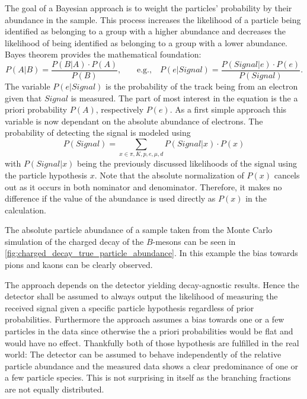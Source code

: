 The goal of a Bayesian approach is to weight the particles' probability by their abundance in the sample. This process increases the likelihood of a particle being identified as belonging to a group with a higher abundance and decreases the likelihood of being identified as belonging to a group with a lower abundance. Bayes theorem provides the mathematical foundation:
\begin{equation*}
	\displaystyle P(A|B) = \frac{P(B|A) \cdot P(A)}{P(B)}
	\text{,}
	\qquad
	\text{e.g.,} \quad P(e|Signal) = \frac{P(Signal|e) \cdot P(e)}{P(Signal)}.
\end{equation*}
The variable $P(e|Signal)$ is the probability of the track being from an electron given that $Signal$ is measured. The part of most interest in the equation is the a priori probability $P(A)$, respectively $P(e)$. As a first simple approach this variable is now dependant on the absolute abundance of electrons. The probability of detecting the signal is modeled using
\begin{equation*}
	P(Signal) = \sum \limits_{x \in {\pi, K, p, e, \mu, d}} P(Signal|x) \cdot P(x)
\end{equation*}
with $P(Signal|x)$ being the previously discussed likelihoods of the signal using the particle hypothesis $x$. Note that the absolute normalization of $P(x)$ cancels out as it occurs in both nominator and denominator. Therefore, it makes no difference if the value of the abundance is used directly as $P(x)$ in the calculation.

The absolute particle abundance of a sample taken from the Monte Carlo simulation of the charged decay of the $B$-mesons can be seen in \autoref{fig:charged_decay_true_particle_abundance}. In this example the bias towards pions and kaons can be clearly observed.

The approach depends on the detector yielding decay-agnostic results. Hence the detector shall be assumed to always output the likelihood of measuring the received signal given a specific particle hypothesis regardless of prior probabilities. Furthermore the approach assumes a bias towards one or a few particles in the data since otherwise the a priori probabilities would be flat and would have no effect.
Thankfully both of those hypothesis are fulfilled in the real world: The detector can be assumed to behave independently of the relative particle abundance and the measured data shows a clear predominance of one or a few particle species. This is not surprising in itself as the branching fractions are not equally distributed.

